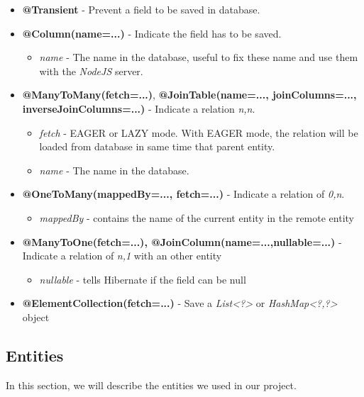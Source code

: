 \begin{itemize}
\item \textbf{@Transient} - Prevent a field to be saved in database.
\item \textbf{@Column(name=...)} - Indicate the field has to be saved.
	
	\begin{itemize}
		\item \textit{name} - The name in the database, useful to fix these name and use them with the \textit{NodeJS} server.
	\end{itemize}
	
\item \textbf{@ManyToMany(fetch=...)}, \textbf{@JoinTable(name=..., joinColumns=..., inverseJoinColumns=...)} - Indicate a relation \textit{n,n}.
\begin{itemize}
\item \textit{fetch} - EAGER or LAZY mode. With EAGER mode, the relation will be loaded from database in same time that parent entity.
\item \textit{name} - The name in the database.
\end{itemize}

\item \textbf{@OneToMany(mappedBy=..., fetch=...)} - Indicate a relation of \textit{0,n}.
	\begin{itemize}
	\item \textit{mappedBy} - contains the name of the current entity in the remote entity
\end{itemize}


\item \textbf{@ManyToOne(fetch=...), @JoinColumn(name=...,nullable=...)} - Indicate a relation of \textit{n,1} with an other entity
	\begin{itemize}
	\item \textit{nullable} - tells Hibernate if the field can be null
\end{itemize}


\item \textbf{@ElementCollection(fetch=...)} - Save a \textit{List<?>} or \textit{HashMap<?,?>} object


\end{itemize}


\newpage
\subsection{Entities}

In this section, we will describe the entities we used in our project. 

